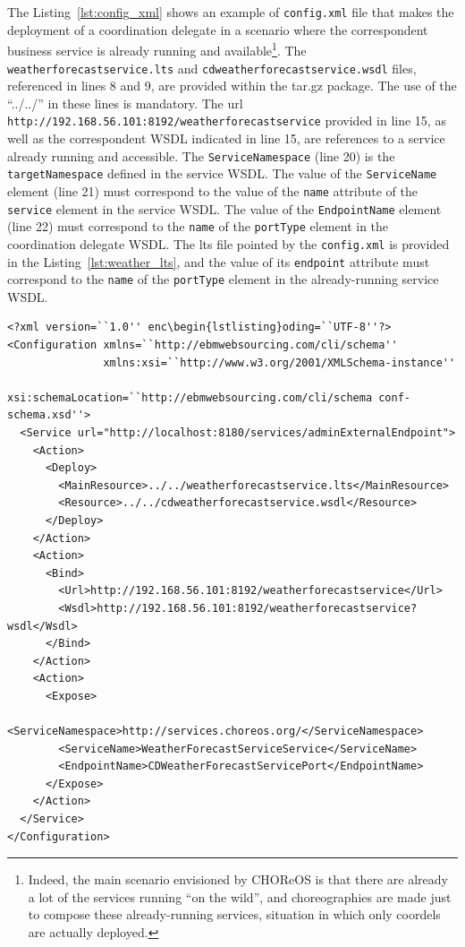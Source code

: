 \documentclass[a4paper, 10pt]{article}
\begin{document}
The Listing~\ref{lst:config_xml} shows an example of \texttt{config.xml} file that makes the deployment of a coordination delegate in a scenario where the correspondent business service is already running and available\footnote{Indeed, the main scenario envisioned by CHOReOS is that there are already a lot of the services running ``on the wild'', and choreographies are made just to compose these already-running services, situation in which only coordels are actually deployed.}. The \texttt{weatherforecastservice.lts} and \texttt{cdweatherforecastservice.wsdl} files, referenced in lines 8 and 9, are provided within the tar.gz package. The use of the ``../../'' in these lines is mandatory. The url \texttt{http://192.168.56.101:8192/weatherforecastservice} provided in line 15, as well as the correspondent WSDL indicated in line 15, are references to a service already running and accessible. The \texttt{ServiceNamespace} (line 20) is the \texttt{targetNamespace} defined in the service WSDL. The value of the \texttt{ServiceName} element (line 21) must correspond to the value of the \texttt{name} attribute of the \texttt{service} element in the service WSDL. The value of the \texttt{EndpointName} element (line 22) must correspond to the \texttt{name} of the \texttt{portType} element in the coordination delegate WSDL. The lts file pointed by the \texttt{config.xml} is provided in the Listing~\ref{lst:weather_lts}, and the value of its \texttt{endpoint} attribute must correspond to the \texttt{name} of the \texttt{portType} element in the already-running service WSDL.

{\footnotesize
\begin{lstlisting}[caption=Example of \texttt{config.xml} that deploys a coordination delegate, label=lst:config_xml]
<?xml version=``1.0'' enc\begin{lstlisting}oding=``UTF-8''?>
<Configuration xmlns=``http://ebmwebsourcing.com/cli/schema'' 
               xmlns:xsi=``http://www.w3.org/2001/XMLSchema-instance''
               xsi:schemaLocation=``http://ebmwebsourcing.com/cli/schema conf-schema.xsd''>
  <Service url="http://localhost:8180/services/adminExternalEndpoint">
    <Action>
      <Deploy>
        <MainResource>../../weatherforecastservice.lts</MainResource>
        <Resource>../../cdweatherforecastservice.wsdl</Resource>
      </Deploy>
    </Action>
    <Action>
      <Bind>
        <Url>http://192.168.56.101:8192/weatherforecastservice</Url>
        <Wsdl>http://192.168.56.101:8192/weatherforecastservice?wsdl</Wsdl>
      </Bind>
    </Action>
    <Action>
      <Expose>
        <ServiceNamespace>http://services.choreos.org/</ServiceNamespace>
        <ServiceName>WeatherForecastServiceService</ServiceName>
        <EndpointName>CDWeatherForecastServicePort</EndpointName>
      </Expose>
    </Action>
  </Service>
</Configuration>
\end{lstlisting}
}
\end{document}

